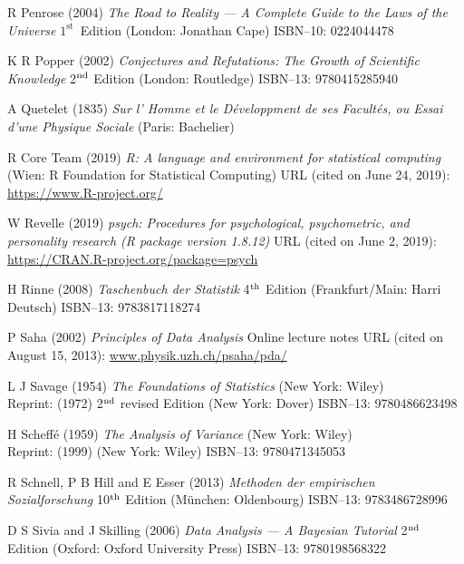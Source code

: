 \begin{thebibliography}{99}
R Penrose
(2004) \textit{The Road to Reality --- A Complete Guide to the Laws
of the Universe}
$1^{\text{st}}$~Edition (London: Jonathan Cape)
ISBN--10: 0224044478

K R Popper
(2002) \textit{Conjectures and Refutations: The Growth of
Scientific Knowledge} 2$^{\rm nd}$ Edition (London: Routledge)
ISBN--13: 9780415285940

A Quetelet
(1835) \textit{Sur l' Homme et le D\'{e}veloppment de ses 
Facult\'{e}s, ou Essai d'une Physique Sociale} (Paris: Bachelier)

R Core Team
(2019) \textit{R: A language and environment for statistical
computing} (Wien: R Foundation for Statistical Computing)
URL (cited on June 24, 2019): \href{https://www.R-project.org/}{https://www.R-project.org/}

W Revelle
(2019) \textit{psych: Procedures for psychological, psychometric,
and personality research (R package version 1.8.12)}
URL (cited on June 2, 2019): 
\href{https://CRAN.R-project.org/package=psych}{https://CRAN.R-project.org/package=psych}

H Rinne
(2008) \textit{Taschenbuch der Statistik}
4$^{\rm th}$ Edition (Frankfurt/Main: Harri Deutsch)
ISBN--13: 9783817118274

P Saha
(2002) \textit{Principles of Data Analysis} Online lecture notes
URL (cited on August 15, 2013):
\href{http://www.physik.uzh.ch/~psaha/pda/pda-a4.pdf}{www.physik.uzh.ch/\texttildelow psaha/pda/}

L J Savage
(1954) \textit{The Foundations of Statistics} (New York: Wiley)\\
Reprint: (1972) 2$^{\rm nd}$ revised Edition (New York: Dover) 
ISBN--13: 9780486623498

H Scheff\'{e}
(1959) \textit{The Analysis of Variance}
(New York: Wiley)\\
Reprint: (1999) (New York: Wiley) ISBN--13: 9780471345053

R Schnell, P B Hill and E Esser
(2013) \textit{Methoden der empirischen Sozialforschung} 10$^{\rm 
th}$ Edition (M\"{u}nchen: Oldenbourg) ISBN--13: 9783486728996

D S Sivia and J Skilling
(2006) \textit{Data Analysis --- A Bayesian Tutorial}
2$^{\rm nd}$ Edition (Oxford: Oxford University Press)
ISBN--13: 9780198568322


\end{thebibliography}
